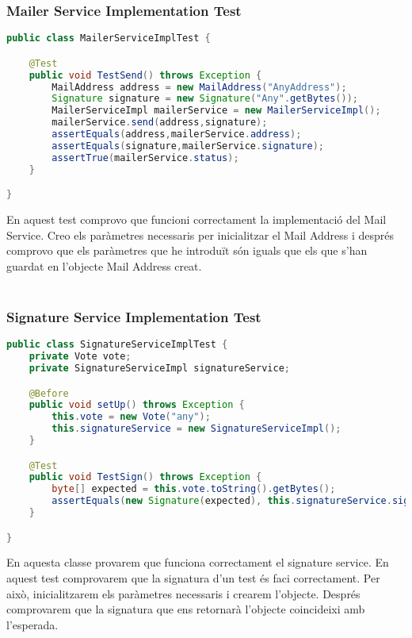 \documentclass[11pt]{article}
\begin{document}
	\subsubsection{Mailer Service Implementation Test}
	\begin{lstlisting}[basicstyle=\ttfamily\scriptsize,language=Java]
public class MailerServiceImplTest {

    @Test
    public void TestSend() throws Exception {
        MailAddress address = new MailAddress("AnyAddress");
        Signature signature = new Signature("Any".getBytes());
        MailerServiceImpl mailerService = new MailerServiceImpl();
        mailerService.send(address,signature);
        assertEquals(address,mailerService.address);
        assertEquals(signature,mailerService.signature);
        assertTrue(mailerService.status);
    }

}
	\end{lstlisting}
	En aquest test comprovo que funcioni correctament la implementació del Mail Service. Creo els paràmetres necessaris per inicialitzar el Mail Address i després comprovo que els paràmetres que he introduït són iguals que els que s'han guardat en l'objecte Mail Address creat.
	\\\\
	\subsubsection{Signature Service Implementation Test}
	\begin{lstlisting}[basicstyle=\ttfamily\scriptsize,language=Java]
public class SignatureServiceImplTest {
    private Vote vote;
    private SignatureServiceImpl signatureService;

    @Before
    public void setUp() throws Exception {
        this.vote = new Vote("any");
        this.signatureService = new SignatureServiceImpl();
    }

    @Test
    public void TestSign() throws Exception {
        byte[] expected = this.vote.toString().getBytes();
        assertEquals(new Signature(expected), this.signatureService.sign(this.vote));
    }

}
	\end{lstlisting}
	En aquesta classe provarem que funciona correctament el signature service. En aquest test comprovarem que la signatura d'un test és faci correctament. Per això, inicialitzarem els paràmetres necessaris i crearem l'objecte. Després comprovarem que la signatura que ens retornarà l'objecte coincideixi amb l'esperada.
	\newpage
\end{document}
